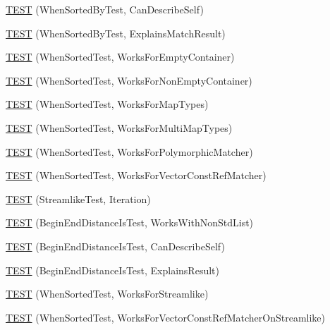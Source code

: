 \begin{DoxyCompactItemize}
\item 
\hyperlink{namespacetesting_1_1gmock__matchers__test_afc2d1e86837d8e3103748cb2e96b61c3}{T\+E\+ST} (When\+Sorted\+By\+Test, Can\+Describe\+Self)
\item 
\hyperlink{namespacetesting_1_1gmock__matchers__test_ada0850ab21beccb47802aab36c06d163}{T\+E\+ST} (When\+Sorted\+By\+Test, Explains\+Match\+Result)
\item 
\hyperlink{namespacetesting_1_1gmock__matchers__test_a76aaffd49c78fdee18f11fae5ea3f6fb}{T\+E\+ST} (When\+Sorted\+Test, Works\+For\+Empty\+Container)
\item 
\hyperlink{namespacetesting_1_1gmock__matchers__test_a2bfbef7e777d319e3d96fc98340bb558}{T\+E\+ST} (When\+Sorted\+Test, Works\+For\+Non\+Empty\+Container)
\item 
\hyperlink{namespacetesting_1_1gmock__matchers__test_acc4a96f3aa369fda8f554f5ac4495f4b}{T\+E\+ST} (When\+Sorted\+Test, Works\+For\+Map\+Types)
\item 
\hyperlink{namespacetesting_1_1gmock__matchers__test_ab5de36ad02781be67163ae24d08b5454}{T\+E\+ST} (When\+Sorted\+Test, Works\+For\+Multi\+Map\+Types)
\item 
\hyperlink{namespacetesting_1_1gmock__matchers__test_a587c3799433426782ccdcfe5cb07f5bc}{T\+E\+ST} (When\+Sorted\+Test, Works\+For\+Polymorphic\+Matcher)
\item 
\hyperlink{namespacetesting_1_1gmock__matchers__test_a0975bae51ce06a819dc1437134fd7f05}{T\+E\+ST} (When\+Sorted\+Test, Works\+For\+Vector\+Const\+Ref\+Matcher)
\item 
\hyperlink{namespacetesting_1_1gmock__matchers__test_a5aa4eed927d4a1a8ea306d5e47dce94f}{T\+E\+ST} (Streamlike\+Test, Iteration)
\item 
\hyperlink{namespacetesting_1_1gmock__matchers__test_add74820690e798ae8a365d08b68ddf71}{T\+E\+ST} (Begin\+End\+Distance\+Is\+Test, Works\+With\+Non\+Std\+List)
\item 
\hyperlink{namespacetesting_1_1gmock__matchers__test_aa4ef2a94a7d75aa6116e8537deaa5f56}{T\+E\+ST} (Begin\+End\+Distance\+Is\+Test, Can\+Describe\+Self)
\item 
\hyperlink{namespacetesting_1_1gmock__matchers__test_a89445da783c74dfa09c9c09531646f5b}{T\+E\+ST} (Begin\+End\+Distance\+Is\+Test, Explains\+Result)
\item 
\hyperlink{namespacetesting_1_1gmock__matchers__test_a8de8e3760418cfcd33913cd30f16d117}{T\+E\+ST} (When\+Sorted\+Test, Works\+For\+Streamlike)
\item 
\hyperlink{namespacetesting_1_1gmock__matchers__test_aa6bfe7b6cc288d93f60b9f52e095b233}{T\+E\+ST} (When\+Sorted\+Test, Works\+For\+Vector\+Const\+Ref\+Matcher\+On\+Streamlike)

\end{DoxyCompactItemize}

